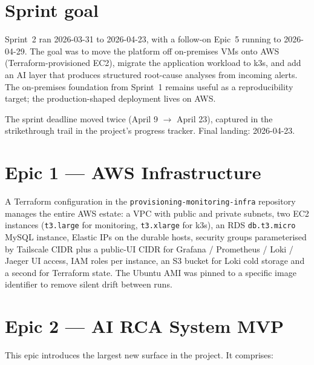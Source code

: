 \documentclass[11pt,a4paper,oneside]{report}
\begin{document}
\section{Sprint goal}

Sprint~2 ran 2026-03-31 to 2026-04-23, with a follow-on Epic~5 running
to 2026-04-29.  The goal was to move the platform off on-premises VMs
onto AWS (Terraform-provisioned EC2), migrate the application workload
to k3s, and add an AI layer that produces structured root-cause analyses
from incoming alerts.  The on-premises foundation from Sprint~1 remains
useful as a reproducibility target; the production-shaped deployment
lives on AWS.

The sprint deadline moved twice (April 9 $\rightarrow$ April 23),
captured in the strikethrough trail in the project's progress tracker.
Final landing: 2026-04-23.

\section{Epic 1 --- AWS Infrastructure}

A Terraform configuration in the \texttt{provisioning-monitoring-infra}
repository manages the entire AWS estate: a VPC with public and
private subnets, two EC2 instances (\texttt{t3.large} for monitoring,
\texttt{t3.xlarge} for k3s), an RDS \texttt{db.t3.micro} MySQL
instance, Elastic IPs on the durable hosts, security groups
parameterised by Tailscale CIDR plus a public-UI CIDR for Grafana /
Prometheus / Loki / Jaeger UI access, IAM roles per instance, an S3
bucket for Loki cold storage and a second for Terraform state.  The
Ubuntu AMI was pinned to a specific image identifier to remove silent
drift between runs.

\section{Epic 2 --- AI RCA System MVP}

This epic introduces the largest new surface in the project.  It
comprises:
\end{document}

